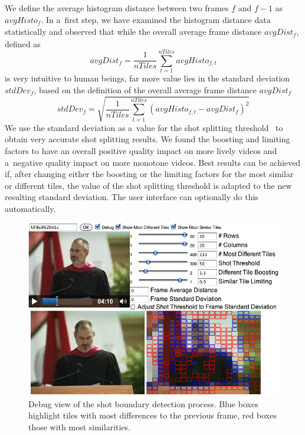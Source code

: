 We define the average histogram distance between two frames
$\mathit{f}$ and $\mathit{f - 1}$ as $\mathit{avgHisto_{f}}$.
In a~first step, we have examined the histogram distance
data statistically and observed that while
the overall average frame distance $\mathit{avgDist_{f}}$,
defined as $$\mathit{avgDist_{f}} =
\frac{1}{\mathit{nTiles}}\sum_{t=1}^{\mathit{nTiles}}
\mathit{avgHisto_{f, t}}$$ is very intuitive to human beings,
far more value lies in the standard deviation
$\mathit{stdDev_{f}}$, based on the definition of the overall
average frame distance $\mathit{avgDist_{f}}$
$$\mathit{stdDev_{f}} =
\sqrt{\frac{1}{\mathit{nTiles}}\sum_{t=1}^{\mathit{nTiles}}
(\mathit{avgHisto_{f, t}} - \mathit{avgDist_{f}})^{2}}$$
We use the standard deviation as a~value for the shot splitting
threshold~\cite{lienhart1999comparison}
to obtain very accurate shot splitting results.
We found the boosting and limiting factors to have an overall
positive quality impact on more lively videos
and a~negative quality impact on more monotone videos.
Best results can be achieved if,
after changing either the boosting or the limiting factors
for the most similar or different tiles,
the value of the shot splitting threshold is adapted
to the new resulting standard deviation.
The user interface can optionally do this automatically.

\begin{figure}
\centering
    \includegraphics[width=1.0\linewidth]{./algorithm.png}
  \caption[Debug view of the shot boundary detection process]
    {Debug view of the shot boundary detection process.
    Blue boxes highlight tiles with most differences
    to the previous frame, red boxes those with most similarities.}
  \label{fig:algorithm}
\end{figure}

